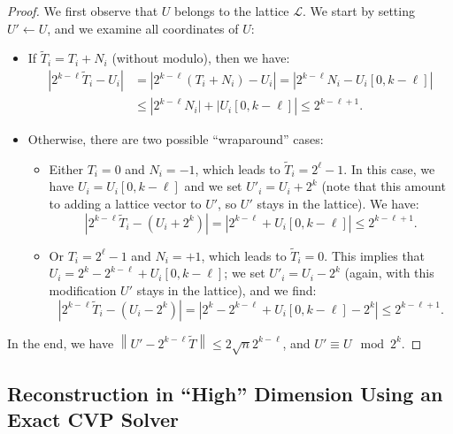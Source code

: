 \documentclass[submission,svgnames,journal=tosc]{iacrtrans}
\begin{document}
\begin{proof}
  We first observe that $U$ belongs to the lattice $\mathcal{L}$. We start by setting $U' \gets U$, and we examine all coordinates of $U$:
  \begin{itemize}
  \item If $\widetilde{T}_i = T_i + N_i$ (without modulo), then we have:
    \begin{align*}
      \left| 2^{k-\ell}\widetilde{T}_i-U_i \right| &= \left| 2^{k-\ell}(T_i + N_i)-U_i \right| 
                                                     = \left| 2^{k-\ell}N_i - U_i[0,k-\ell] \right| \\
                                                   &\leq \left| 2^{k-\ell}N_i\rvert + \lvert U_i[0,k-\ell] \right| 
      \leq 2^{k-\ell +1 }.
    \end{align*}
    
  \item Otherwise, there are two possible ``wraparound'' cases:
    \begin{itemize}
    \item Either $T_i = 0$ and $N_i = -1$, which leads to $\widetilde{T}_i = 2^\ell-1$. 
      In this case, we have $U_i = U_i[0,k-\ell]$ and we set $U'_i = U_i + 2^{k}$ (note that this amount to adding a lattice vector to $U'$, so $U'$ stays in the lattice). We have:
      \[
        \left| 2^{k-\ell}\widetilde{T}_i-(U_i + 2^k) \right| = %
        \left| 2^{k-\ell} + U_i[0,k-\ell]\right| \leq 2^{k-\ell + 1}. 
      \]
      
    \item Or $T_i = 2^{\ell}-1$ and $N_i = +1$, which leads to
      $\widetilde{T}_i = 0$.  This implies that
      $U_i= 2^k-2^{k-\ell} + U_i[0,k-\ell]$; we set $U'_i = U_i - 2^k$ (again,
      with this modification $U'$ stays in the lattice), and we find:
      \[
        \left| 2^{k-\ell}\widetilde{T}_i-(U_i - 2^k) \right| %
        = \left| 2^k-2^{k-\ell} + U_i[0,k-\ell] - 2^k\right| \leq 2^{k-\ell + 1}.
      \]
    \end{itemize}
  \end{itemize}
  In the end, we have
  $\left\| U' -2^{k-\ell} \widetilde{T} \right\| \leq 2 \sqrt{n} 2^{k-\ell}$,
  and $U' \equiv U \mod 2^k $.
\end{proof}

\subsection{Reconstruction in ``High'' Dimension Using an Exact CVP Solver}
\label{sec:cvp_big}
\end{document}
